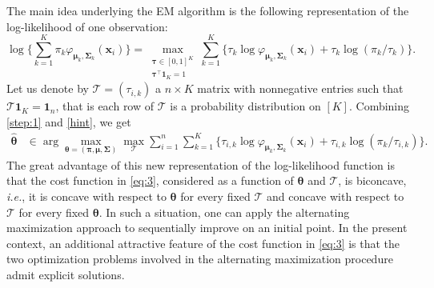 \documentclass[a4paper,12pt]{article}
\def\hat{\widehat}
\def\bSigma{\boldsymbol\Sigma}
\def\bmu{\boldsymbol\mu}
\def\btau{\boldsymbol\tau}
\def\bTau{\boldsymbol{\mathcal T}}
\def\btheta{{\boldsymbol\theta}}
\def\bx{\boldsymbol x}
\def\bpi{\boldsymbol \pi}
\def\b1{\mathbf 1}
\begin{document}
The main idea underlying the EM algorithm is the following representation of the log-likelihood
of one observation:
\begin{equation}\label{hint}
\log\bigg\{{\sum_{k=1}^K\pi_k\varphi_{\bmu_{k},\bSigma_{k}}(\bx_i)}\bigg\} =
\max_{\substack{\btau\in[0,1]^K \\ \btau^\top \b1_K=1}} \sum_{k=1}^K \Big\{\tau_{k}\log\varphi_{\bmu_{k},\bSigma_{k}}(\bx_i)+\tau_{k} \log(\pi_k/\tau_{k})\Big\}.
\end{equation}
Let us denote by $\bTau = (\tau_{i,k})$ a $n\times K$ matrix with nonnegative entries such that $\bTau\b1_K = \b1_n$, that is each 
row of $\bTau$ is a probability distribution on $[K]$. Combining \eqref{step:1} and \eqref{hint}, we get
\begin{align}\label{eq:3}
\hat\btheta
    &\in\arg\max_{\btheta=(\bpi,\bmu,\bSigma)}\max_{\bTau}  
    \sum_{i=1}^{n} \sum_{k=1}^K \Big\{\tau_{i,k}\log\varphi_{\bmu_{k},\bSigma_{k}}(\bx_i)+\tau_{i,k} 
    \log(\pi_k/\tau_{i,k})\Big\}.
\end{align}
The great advantage of this new representation of the log-likelihood function is that the cost 
function in \eqref{eq:3}, considered as a function of $\btheta$ and $\bTau$, is biconcave, \textit{i.e.}, 
it is concave with respect to $\btheta$ for every fixed $\bTau$ and concave with respect to $\bTau$ for 
every fixed $\btheta$. In such a situation, one can apply the alternating maximization approach to sequentially  
improve on an initial point. In the present context, an additional attractive feature of the cost function
in \eqref{eq:3} is that the two optimization problems involved in the alternating maximization procedure
admit explicit solutions. 
\end{document}
